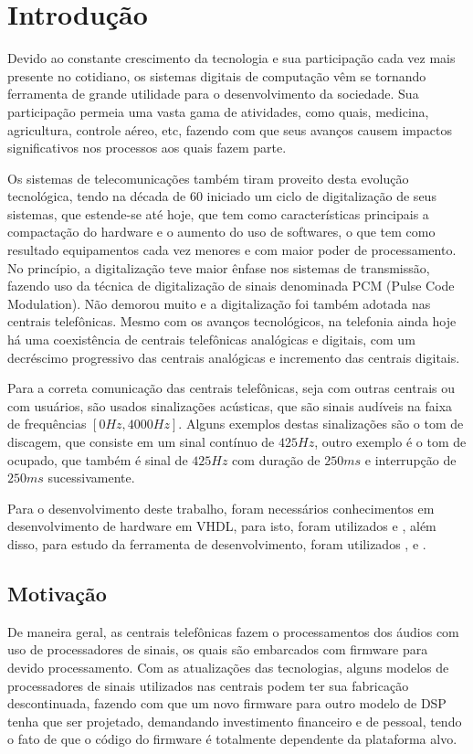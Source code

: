 \documentclass[monografia]{subfiles}
\begin{document}
	\chapter{Introdução}	
		Devido ao constante crescimento da tecnologia e sua participação cada vez mais presente no cotidiano,
		os sistemas digitais de computação vêm se tornando ferramenta de grande utilidade para o desenvolvimento da sociedade. 
		Sua participação permeia uma vasta gama de atividades, como quais, medicina, agricultura, controle aéreo, etc,
		fazendo com que seus avanços causem impactos significativos nos processos aos quais fazem parte.

		Os sistemas de telecomunicações também tiram proveito desta evolução tecnológica, 
		tendo na década de 60 iniciado um ciclo de digitalização de seus sistemas, que estende-se até hoje, que tem como características
		principais a compactação do hardware e o aumento do uso de softwares, o que tem como resultado equipamentos cada vez menores e com 
		maior poder de processamento. 
		No princípio, a digitalização teve maior ênfase nos sistemas de transmissão, fazendo uso da técnica de digitalização de sinais denominada
		PCM (Pulse Code Modulation). Não demorou muito e a digitalização foi também adotada nas centrais telefônicas.
		Mesmo com os avanços tecnológicos, na telefonia ainda hoje há uma coexistência de centrais telefônicas analógicas e digitais, com um decréscimo progressivo
		das centrais analógicas e incremento das centrais digitais.

		Para a correta comunicação das centrais telefônicas, seja com outras centrais ou com usuários, são usados sinalizações acústicas, que são sinais
		audíveis na faixa de frequências $[0Hz,4000Hz]$. Alguns exemplos destas sinalizações são o tom de discagem, que consiste em um sinal contínuo de $425 Hz$,
		outro exemplo é o tom de ocupado, que também é sinal de $425 Hz$ com duração de $250ms$ e interrupção de $250ms$ sucessivamente.

		Para o desenvolvimento deste trabalho, foram necessários conhecimentos em desenvolvimento de hardware em VHDL, para isto, foram utilizados 
		\cite{pedroni} e \cite{mesquita}, além disso, para estudo da ferramenta de desenvolvimento, foram utilizados \cite{virtex6_CLB}, \cite{virtex6}
		\cite{edk} e \cite{edkConcepts}.







	\section{Motivação}
		De maneira geral, as centrais telefônicas fazem o processamentos dos áudios com uso de processadores de sinais, os quais são embarcados com firmware
		para devido processamento.
		Com as atualizações das tecnologias, alguns modelos de processadores de sinais utilizados nas centrais podem ter sua fabricação
		descontinuada, fazendo com que um novo firmware para outro modelo de DSP tenha que ser projetado, demandando investimento financeiro e de pessoal,
		tendo o fato de que o código do firmware é totalmente dependente da plataforma alvo.
\end{document}
